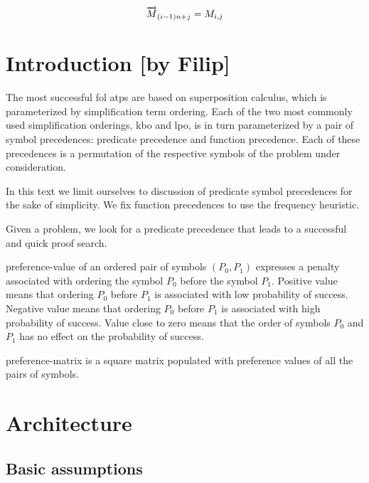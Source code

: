 \begin{align*}
\overrightarrow{M}_{(i - 1) n + j} = M_{i, j}
\end{align*}

\newpage

\section{Introduction [by Filip]}

The most successful \gls{fol} \glspl{atp} are based on superposition calculus,
which is parameterized by simplification term ordering.
Each of the two most commonly used simplification orderings, \gls{kbo} and \gls{lpo},
is in turn parameterized by a pair of symbol precedences:
predicate precedence and function precedence.
Each of these precedences is a permutation of the respective symbols of the problem under consideration.

In this text we limit ourselves to discussion of predicate symbol precedences for the sake of simplicity.
We fix function precedences to use the frequency heuristic.

Given a problem, we look for a predicate \gls{precedence} that leads to a successful and quick proof search.

\Gls{preference-value} of an ordered pair of symbols \((P_0, P_1)\) expresses a penalty associated with ordering the symbol \(P_0\) before the symbol \(P_1\).
Positive value means that ordering \(P_0\) before \(P_1\) is associated with low probability of success.
Negative value means that ordering \(P_0\) before \(P_1\) is associated with high probability of success.
Value close to zero means that the order of symbols \(P_0\) and \(P_1\) has no effect on the probability of success.

\Gls{preference-matrix} is a square matrix populated with preference values of all the pairs of symbols.

\section{Architecture}
\label{sec:architecture}

\subsection{Basic assumptions}

